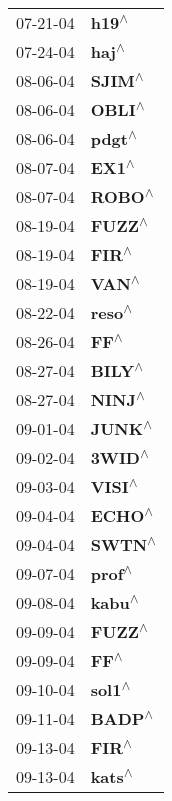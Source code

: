 \begin{supertabular}{p{0.08\textwidth}p{0.2\textwidth}}
 07-21-04 &     \textbf{h19\textsuperscript{$\wedge$}} \\
 07-24-04 &     \textbf{haj\textsuperscript{$\wedge$}} \\
 08-06-04 &    \textbf{SJIM\textsuperscript{$\wedge$}} \\
 08-06-04 &    \textbf{OBLI\textsuperscript{$\wedge$}} \\
 08-06-04 &    \textbf{pdgt\textsuperscript{$\wedge$}} \\
 08-07-04 &     \textbf{EX1\textsuperscript{$\wedge$}} \\
 08-07-04 &    \textbf{ROBO\textsuperscript{$\wedge$}} \\
 08-19-04 &    \textbf{FUZZ\textsuperscript{$\wedge$}} \\
 08-19-04 &     \textbf{FIR\textsuperscript{$\wedge$}} \\
 08-19-04 &     \textbf{VAN\textsuperscript{$\wedge$}} \\
 08-22-04 &    \textbf{reso\textsuperscript{$\wedge$}} \\
 08-26-04 &      \textbf{FF\textsuperscript{$\wedge$}} \\
 08-27-04 &    \textbf{BILY\textsuperscript{$\wedge$}} \\
 08-27-04 &    \textbf{NINJ\textsuperscript{$\wedge$}} \\
 09-01-04 &    \textbf{JUNK\textsuperscript{$\wedge$}} \\
 09-02-04 &    \textbf{3WID\textsuperscript{$\wedge$}} \\
 09-03-04 &    \textbf{VISI\textsuperscript{$\wedge$}} \\
 09-04-04 &    \textbf{ECHO\textsuperscript{$\wedge$}} \\
 09-04-04 &    \textbf{SWTN\textsuperscript{$\wedge$}} \\
 09-07-04 &    \textbf{prof\textsuperscript{$\wedge$}} \\
 09-08-04 &    \textbf{kabu\textsuperscript{$\wedge$}} \\
 09-09-04 &    \textbf{FUZZ\textsuperscript{$\wedge$}} \\
 09-09-04 &      \textbf{FF\textsuperscript{$\wedge$}} \\
 09-10-04 &    \textbf{sol1\textsuperscript{$\wedge$}} \\
 09-11-04 &    \textbf{BADP\textsuperscript{$\wedge$}} \\
 09-13-04 &     \textbf{FIR\textsuperscript{$\wedge$}} \\
 09-13-04 &    \textbf{kats\textsuperscript{$\wedge$}} \\

\end{supertabular}
